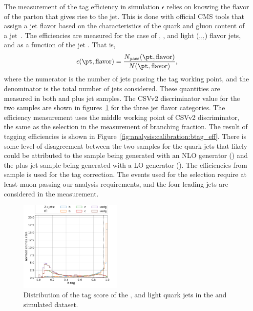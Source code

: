 The measurement of the \PQb tag efficiency in simulation $\epsilon$ relies on knowing the flavor of the parton that gives rise to the jet.  This is done with official CMS tools that assign a jet flavor based on the characteristics of the quark and gluon content of a jet~\cite{twiki:jet_mc_flavor}.  The efficiencies are measured for the case of \PQb, \PQc, and light (\PQu,\PQs,\PQd,\Pg) flavor jets, and as a function of the jet \pt.  That is,
\begin{equation}
    \epsilon(\pt, \mathrm{flavor}) = \frac{ N_{\mathrm{pass}}(\pt, \mathrm{flavor})} {N(\pt, \mathrm{flavor})},
\end{equation}
\noindent where the numerator is the number of jets passing the \PQb tag working point, and the denominator is the total number of jets considered. These quantities are measured in both \ttbar and \PZ plus jet samples. The CSVv2 discriminator value for the two samples are shown in figures~\ref{fig:analysis:calibration:btag_csvv2} for the three jet flavor categories. The efficiency measurement uses the middle working point of CSVv2 discriminator, the same as the selection in the measurement of \PW branching fraction. The result of \PQb tagging efficiencies is shown in Figure~\ref{fig:analysis:calibration:btag_eff}.  There is some level of disagreement between the two samples for the \PQb quark jets that likely could be attributed to the \ttbar sample being generated with an NLO generator (\POWHEG) and the \PZ plus jet sample being generated with a LO generator (\MADGRAPH). The efficiencies from \ttbar sample is used for the \PQb tag correction. The events used for the selection require at least muon passing our analysis requirements, and the four leading \pt jets are considered in the measurement.
\begin{figure}[h!]
    \centering
    \includegraphics[width=0.45\textwidth]{chapters/Analysis/sectionCalibration/figures/btag/bmva_mc.pdf}
    \caption{Distribution of the \PQb tag score of the \PQb, \PQc and light quark jets in the \zjets and \ttbar simulated dataset.      
    \label{fig:analysis:calibration:btag_csvv2}}
\end{figure}
